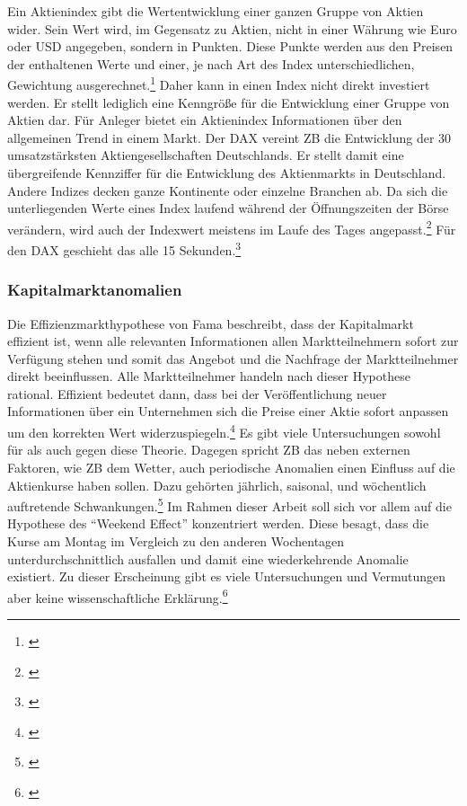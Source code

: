 Ein Aktienindex gibt die Wertentwicklung einer ganzen Gruppe von Aktien wider. Sein Wert wird, im Gegensatz zu Aktien, nicht in einer Währung wie Euro oder \gls{USD} angegeben, sondern in Punkten. Diese Punkte werden aus den Preisen der enthaltenen Werte und einer, je nach Art des Index unterschiedlichen, Gewichtung ausgerechnet.\footnote{\cite[Vgl.][61]{Daume2021}} Daher kann in einen Index nicht direkt investiert werden. Er stellt lediglich eine Kenngröße für die Entwicklung einer Gruppe von Aktien dar. Für Anleger bietet ein Aktienindex Informationen über den allgemeinen Trend in einem Markt. Der \gls{DAX} vereint \gls{ZB} die Entwicklung der 30 umsatzstärksten Aktiengesellschaften Deutschlands. Er stellt damit eine übergreifende Kennziffer für die Entwicklung des Aktienmarkts in Deutschland. Andere Indizes decken ganze Kontinente oder einzelne Branchen ab. Da sich die unterliegenden Werte eines Index laufend während der Öffnungszeiten der Börse verändern, wird auch der Indexwert meistens im Laufe des Tages angepasst.\footnote{\cite[Vgl.][110]{Grundmann2021}} Für den \gls{DAX} geschieht das alle 15 Sekunden.\footnote{\cite[Vgl.][63]{Daume2021}}

\subsubsection{Kapitalmarktanomalien}



Die Effizienzmarkthypothese von Fama beschreibt, dass der Kapitalmarkt effizient ist, wenn alle relevanten Informationen allen Marktteilnehmern sofort zur Verfügung stehen und somit das Angebot und die Nachfrage der Marktteilnehmer direkt beeinflussen. Alle Marktteilnehmer handeln nach dieser Hypothese rational. Effizient bedeutet dann, dass bei der Veröffentlichung neuer Informationen über ein Unternehmen sich die Preise einer Aktie sofort anpassen um den korrekten Wert widerzuspiegeln.\footnote{\cite[Vgl.][9\psq]{Wagner2019}} Es gibt viele Untersuchungen sowohl für als auch gegen diese Theorie. Dagegen spricht \gls{ZB} das neben externen Faktoren, wie \gls{ZB} dem Wetter, auch periodische Anomalien einen Einfluss auf die Aktienkurse haben sollen. Dazu gehörten jährlich, saisonal, und wöchentlich auftretende Schwankungen.\footnote{\cite[Vgl.][5\psq]{Coenen2020}} Im Rahmen dieser Arbeit soll sich vor allem auf die Hypothese des \enquote{Weekend Effect} konzentriert werden. Diese besagt, dass die Kurse am Montag im Vergleich zu den anderen Wochentagen unterdurchschnittlich ausfallen und damit eine wiederkehrende Anomalie existiert. Zu dieser Erscheinung gibt es viele Untersuchungen und Vermutungen aber keine wissenschaftliche Erklärung.\footnote{\cite[Vgl.][8]{Coenen2020}}

